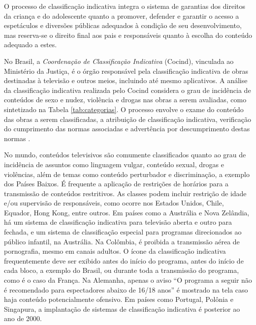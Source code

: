 
O processo de classificação indicativa integra o sistema de garantias dos direitos da criança e do adolescente quanto a promover, defender e garantir o acesso a espetáculos e diversões públicas adequados à condição de seu desenvolvimento, mas reserva-se o direito final aos pais e responsáveis quanto à escolha do conteúdo adequado a estes\cite{eca}.

No Brasil, a \emph{Coordenação de Classificação Indicativa} (Cocind), vinculada ao Ministério da Justiça, é o órgão responsável pela classificação indicativa de obras destinadas à televisão e outros meios, incluindo até mesmo aplicativos. A análise da classificação indicativa realizada pelo Cocind considera o grau de incidência de conteúdos de sexo e nudez, violência e drogas nas obras a serem avaliadas, como sintetizado na Tabela \ref{tab:categorias}. O processo envolve o exame do conteúdo das obras a serem classificadas, a atribuição de classificação indicativa, verificação do cumprimento das normas associadas e advertência por descumprimento destas normas \cite{portaria:ci}.




No mundo, conteúdos televisivos são comumente classificados quanto ao grau de incidência de assuntos como linguagem vulgar, conteúdo sexual, drogas e violências, além de temas como conteúdo perturbador e discriminação, a exemplo dos Países Baixos. É frequente a aplicação de restrições de horários para a transmissão de conteúdos restritivos. As classes podem incluir restrição de idade e/ou supervisão de responsáveis, como ocorre nos Estados Unidos, Chile, Equador, Hong Kong, entre outros. Em países como a Austrália e Nova Zelândia, há um sistema de classificação indicativa para televisão aberta e outro para fechada, e um sistema de classificação especial para programas direcionados ao público infantil, na Austrália. Na Colômbia, é proibida a transmissão aérea de pornografia, mesmo em canais adultos. O ícone da classificação indicativa frequentemente deve ser exibido antes do início do programa, antes do início de cada bloco, a exemplo do Brasil, ou durante toda a transmissão do programa, como é o caso da França.  Na Alemanha, apenas o aviso ``O programa a seguir não é recomendado para espectadores abaixo de 16/18 anos'' é mostrado na tela caso haja conteúdo potencialmente ofensivo. Em países como Portugal, Polônia e Singapura, a implantação de sistemas de classificação indicativa é posterior ao ano de 2000. 
